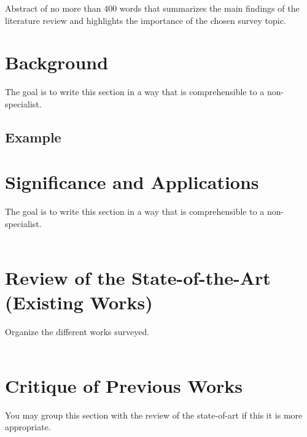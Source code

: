 \documentclass[a4paper,12pt]{article}
\renewenvironment{abstract}
{\normalsize
	\begin{center}
		\bfseries \abstractname\vspace{-1.0em}\vspace{0pt}
	\end{center}
	\list{}{%
		\setlength{\leftmargin}{1mm}%
		\setlength{\rightmargin}{\leftmargin}%
	}%
	\item\relax
	}
{\endlist}
\begin{document}
	\setcounter{page}{2}
	\doublespacing
	\begin{abstract}
	Abstract of no more than 400 words that summarizes the main findings of the literature review and highlights the importance of the chosen survey topic.
	\end{abstract}
	\section{Background}
	\begin{adjustwidth}{3.27em}{0mm}
		The goal is to write this section in a way that is comprehensible to a non-specialist.
		~\cite{6773024}
		
		\subsection{Example}
	\end{adjustwidth}
	
	\section{Significance and Applications}
	\begin{adjustwidth}{3.27em}{0em}
		The goal is to write this section in a way that is comprehensible to a non-specialist.\\
		~\\
	\end{adjustwidth}
	
	\section{Review of the State-of-the-Art (Existing Works)}
	\begin{adjustwidth}{3.27em}{0em}
		Organize the different works surveyed.\\
		~\\
	\end{adjustwidth}
	
	\section{Critique of Previous Works}
	\begin{adjustwidth}{3.27em}{0em}
		You may group this section with the review of the state-of-art if this it is more appropriate.\\
		~\\
	\end{adjustwidth}
	
\end{document}
